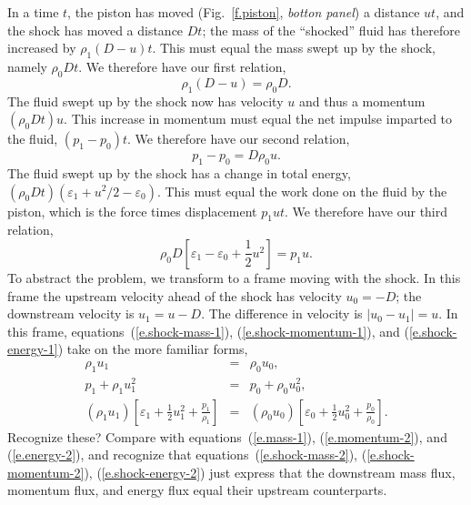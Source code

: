 In a time $t$, the piston has moved (Fig.~\ref{f.piston}, \emph{botton panel}) a distance $ut$, and the shock has moved a distance $Dt$; the mass of the ``shocked'' fluid has therefore increased by $\rho_{1}(D-u)t$.  This must equal the mass swept up by the shock, namely $\rho_{0}Dt$.  We therefore have our first relation,
\begin{equation}\label{e.shock-mass-1}
\rho_{1}(D-u) = \rho_{0}D.
\end{equation}
The fluid swept up by the shock now has velocity $u$ and thus a momentum $(\rho_{0}Dt)u$. This increase in momentum must equal the net impulse imparted to the fluid, $(p_{1}-p_{0})t$.  We therefore have our second relation,
\begin{equation}\label{e.shock-momentum-1}
p_{1} - p_{0} = D\rho_{0}u.
\end{equation}
The fluid swept up by the shock has a change in total energy, $(\rho_{0}D t)(\varepsilon_{1} + u^{2}/2 -\varepsilon_{0})$. This must equal the work done on the fluid by the piston, which is the force times displacement $p_{1}ut$.  We therefore have our third relation,
\begin{equation}\label{e.shock-energy-1}
\rho_{0}D\left[\varepsilon_{1}-\varepsilon_{0} + \frac{1}{2}u^{2}\right] = p_{1}u.
\end{equation}
To abstract the problem, we transform to a frame moving with the shock.  In this frame the upstream velocity ahead of the shock has velocity $u_{0} = -D$; the downstream velocity is $u_{1} = u-D$.  The difference in velocity is $|u_{0} - u_{1}| = u$.
In this frame, equations~(\ref{e.shock-mass-1}), (\ref{e.shock-momentum-1}), and (\ref{e.shock-energy-1}) take on the more familiar forms,
\begin{eqnarray}
\rho_{1}u_{1} &=& \rho_{0}u_{0},\label{e.shock-mass-2}\\
p_{1} + \rho_{1}u_{1}^{2} &=& p_{0} + \rho_{0}u_{0}^{2},\label{e.shock-momentum-2}\\
(\rho_{1}u_{1})\left[\varepsilon_{1} + \frac{1}{2}u_{1}^{2} + \frac{p_{1}}{\rho_{1}}\right] &=& 
	(\rho_{0}u_{0})\left[\varepsilon_{0} + \frac{1}{2}u_{0}^{2} + \frac{p_{0}}{\rho_{0}}\right]. 
			\label{e.shock-energy-2}
\end{eqnarray}
Recognize these?  Compare with equations~(\ref{e.mass-1}), (\ref{e.momentum-2}), and (\ref{e.energy-2}), and recognize that equations~(\ref{e.shock-mass-2}), (\ref{e.shock-momentum-2}), (\ref{e.shock-energy-2}) just express that the downstream mass flux, momentum flux, and energy flux equal their upstream counterparts.

